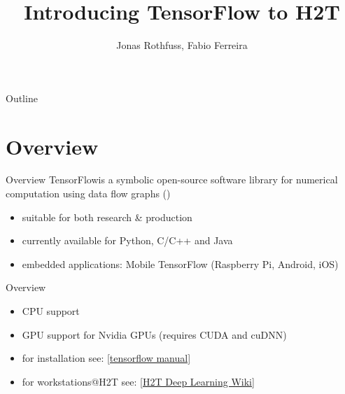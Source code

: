 \documentclass[18pt]{beamer}
\title[Introducing TensorFlow to H2T]{Introducing TensorFlow to H2T}
\subtitle{}
\author{Jonas Rothfuss, Fabio Ferreira}
\institute{High Performance Humanoid Technologies (H2T)}
\begin{document}

\begin{frame}
\titlepage
\end{frame}

\begin{frame}{Outline}
\tableofcontents

\end{frame}

\section{Overview}
\begin{frame}{Overview}
TensorFlow\footnotemark is a symbolic open-source software library for numerical computation using data flow graphs (\cite{tensorflow})

\begin{itemize}
\item suitable for both research \& production
\pause
\item currently available for Python, C/C++ and Java 
\pause
\item embedded applications: Mobile TensorFlow (Raspberry Pi, Android, iOS)
\end{itemize}
\end{frame}

\begin{frame}{Overview}
\begin{itemize}
\item CPU support
\item GPU support for Nvidia GPUs (requires CUDA and cuDNN) 
\pause
\item for installation see: \textcolor{kitgreen}{ \href{https://www.tensorflow.org/install/install_linux}{[tensorflow manual]}}
\item for workstations@H2T see:
\textcolor{kitgreen}{ \href{https://i61wiki.itec.uka.de/redmine/projects/deeplearning-h2t/wiki/Wiki}{[H2T Deep Learning Wiki]}}
\end{itemize}
\end{frame}
\end{document}
